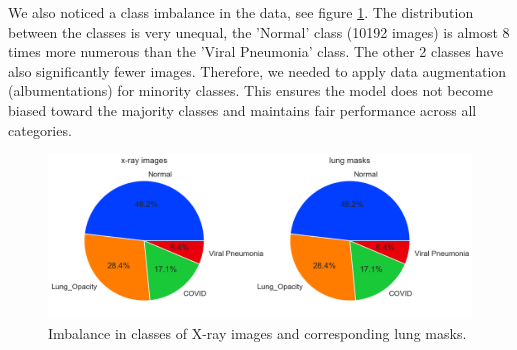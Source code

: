 \documentclass{article}
\begin{document}
We also noticed a class imbalance in the data, see figure \ref{fig:classes}. The distribution between the classes is very unequal, the 'Normal' class (10192 images) is almost 8 times more numerous than the 'Viral Pneumonia' class. The other 2 classes have also significantly fewer images. Therefore, we needed to apply data augmentation (albumentations) for minority classes. This ensures the model does not become biased toward the majority classes and maintains fair performance across all categories.

\begin{figure}[htb]
    \centering
    \includegraphics[width=1\linewidth]{classes.png}
    \caption{Imbalance in classes of X-ray images and corresponding lung masks.}
    \label{fig:classes}
\end{figure}  
\end{document}
